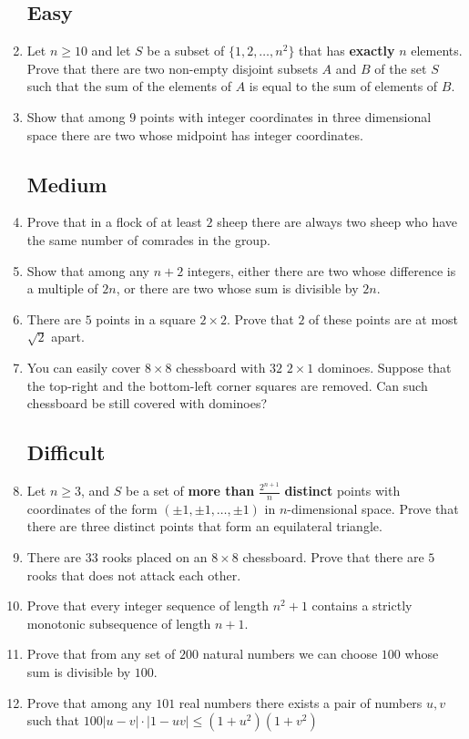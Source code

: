 \documentclass[11pt,a5paper]{article}
\begin{document}
\begin{enumerate}
	\subsection*{Easy}	
	\item{Let $n\geq10$ and let $S$ be a subset of $\{1,2,\dots,n^{2}\}$} that has \textbf{exactly} $n$ elements. Prove that there are two non-empty disjoint subsets $A$ and $B$ of the set $S$ such that the sum of the elements of $A$ is equal to the sum of elements of $B$.
	
	\item{Show that among $9$ points with integer coordinates in three dimensional space there are two whose midpoint has integer coordinates.}
	
	\subsection*{Medium}
	\item{Prove that in a flock of at least $2$ sheep there are always two sheep who have the same number of comrades in the group.}
	
	\item{Show that among any $n+2$ integers, either there are two whose difference is a multiple of $2n$, or there are two whose sum is divisible by $2n$.}
	
	\item{There are $5$ points in a square $2\times 2$. Prove that $2$ of these points are at most $\sqrt2$ apart.}
	
	\item{You can easily cover $8\times 8$ chessboard with $32$ $2\times 1$ dominoes. Suppose that the top-right and the bottom-left corner squares are removed. Can such chessboard be still covered with dominoes?}

	\subsection*{Difficult}
	\item{Let $n\geq3$, and $S$ be a set of \textbf{more than} $\frac{2^{n+1}}{n}$ \textbf{distinct} points with coordinates of the form $(\pm1,\pm1,\dots,\pm1)$ in $n$-dimensional space. Prove that there are three distinct points that form an equilateral triangle.}
	
	\item{There are $33$ rooks placed on an $8\times 8$ chessboard. Prove that there are $5$ rooks that does not attack each other.}
	
	\item{Prove that every integer sequence of length $n^2+1$ contains a strictly monotonic subsequence of length $n+1$.}
	
	\item{Prove that from any set of $200$ natural numbers we can choose $100$ whose sum is divisible by $100$.}
	
	\item{Prove that among any $101$ real numbers there exists a pair of numbers $u, v$ such that $100|u - v|\cdot|1-uv| \leq (1 + u^{2})(1 + v^{2})$}
	
	
\end{enumerate}
\end{document}
